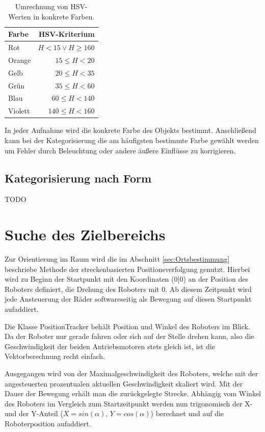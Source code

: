 \begin{table}
	\centering
	\begin{tabular}{lr}
		\toprule
		Farbe & HSV-Kriterium\\
		\midrule
		Rot & $H < 15\vee H \geq 160$ \\
		Orange & $15 \leq H < 20$ \\
		Gelb & $20 \leq H < 35$ \\
		Grün & $35 \leq H < 60$ \\
		Blau & $60 \leq H < 140$ \\
		Violett & $140 \leq H < 160$ \\
												
		\bottomrule
	\end{tabular}
	\caption{Umrechnung von HSV-Werten in konkrete Farben.}
	\label{tab:Farbtabelle}
\end{table}

In jeder Aufnahme wird die konkrete Farbe des Objekts bestimmt. Anschließend kann bei der Kategorisierung die am häufigsten bestimmte Farbe gewählt werden um Fehler durch Beleuchtung oder andere äußere Einflüsse zu korrigieren.

\subsection{Kategorisierung nach Form}
TODO

\section{Suche des Zielbereichs}
\label{sec:Orientierung}

Zur Orientierung im Raum wird die im Abschnitt \ref{sec:Ortsbestimmung} beschriebe Methode der streckenbasierten Positionsverfolgung genutzt. Hierbei wird zu Beginn der Startpunkt mit den Koordinaten (0|0) an der Position des Roboters definiert, die Drehung des Roboters mit 0\degree. Ab diesem Zeitpunkt wird jede Ansteuerung der Räder  softwareseitig als Bewegung auf diesen Startpunkt aufaddiert. 

Die Klasse PositionTracker behält Position und Winkel des Roboters im Blick. Da der Roboter nur gerade fahren oder sich auf der Stelle drehen kann, also die Geschwindigkeit der beiden Antriebsmotoren stets gleich ist, ist die Vektorberechnung recht einfach.

Ausgegangen wird von der Maximalgeschwindigkeit des Roboters, welche mit der angesteuerten prozentualen aktuellen Geschwindigkeit skaliert wird. Mit der Dauer der Bewegung erhält man die zurückgelegte Strecke. Abhängig vom Winkel des Roboters im Vergleich zum Startzeitpunkt werden nun trigonomisch der X- und der Y-Anteil ($X=sin(\alpha)$, $Y=cos(\alpha)$) berechnet und auf die Roboterposition aufaddiert.

